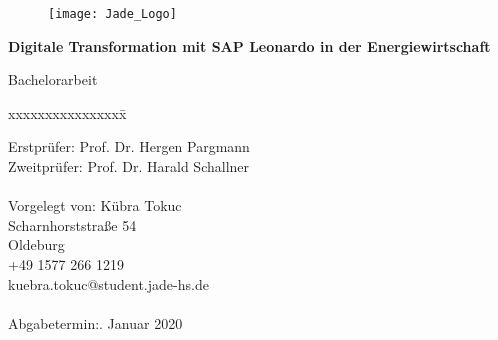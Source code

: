 \begin{titlepage}
  \begin{centering}
  \begin{figure}[h!]
    \centering
    \texttt{[image: Jade\_Logo]}
  \end{figure}



  \vspace*{0.4cm}

  \textsf{\Huge \textbf{Digitale Transformation mit SAP Leonardo in der Energiewirtschaft\\}}

  \vspace*{0.5cm}
  \noindent Bachelorarbeit\\

  \end{centering}

  \vspace*{1.5cm}
  \begin{tabbing}
  xxxxxxxxxxxxxxxx\= \kill

  \small Erstprüfer:\> Prof. Dr. Hergen Pargmann\\
  \small Zweitprüfer:\> Prof. Dr. Harald Schallner\\\\

  \small Vorgelegt von: \>Kübra Tokuc\\
  \small \>Scharnhorststraße 54\\
  \small {} Oldeburg\\
  \small \>+49 1577 266 1219\\
  \small \>kuebra.tokuc@student.jade-hs.de\\\\

  \small Abgabetermin:. Januar 2020
  \end{tabbing}
\end{titlepage}
\newpage
